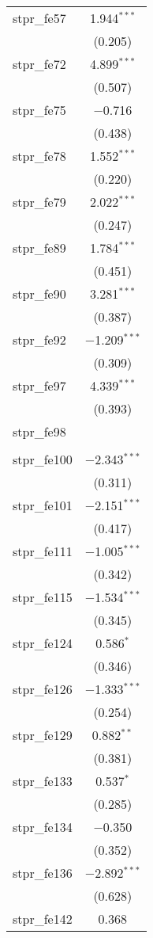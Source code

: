 \begin{table}[!htbp]
\begin{tabular}{@{\extracolsep{5pt}}lc}
  stpr\_fe57 & 1.944$^{***}$ \\ 
  & (0.205) \\ 
  stpr\_fe72 & 4.899$^{***}$ \\ 
  & (0.507) \\ 
  stpr\_fe75 & $-$0.716 \\ 
  & (0.438) \\ 
  stpr\_fe78 & 1.552$^{***}$ \\ 
  & (0.220) \\ 
  stpr\_fe79 & 2.022$^{***}$ \\ 
  & (0.247) \\ 
  stpr\_fe89 & 1.784$^{***}$ \\ 
  & (0.451) \\ 
  stpr\_fe90 & 3.281$^{***}$ \\ 
  & (0.387) \\ 
  stpr\_fe92 & $-$1.209$^{***}$ \\ 
  & (0.309) \\ 
  stpr\_fe97 & 4.339$^{***}$ \\ 
  & (0.393) \\ 
  stpr\_fe98 &  \\ 
  &  \\ 
  stpr\_fe100 & $-$2.343$^{***}$ \\ 
  & (0.311) \\ 
  stpr\_fe101 & $-$2.151$^{***}$ \\ 
  & (0.417) \\ 
  stpr\_fe111 & $-$1.005$^{***}$ \\ 
  & (0.342) \\ 
  stpr\_fe115 & $-$1.534$^{***}$ \\ 
  & (0.345) \\ 
  stpr\_fe124 & 0.586$^{*}$ \\ 
  & (0.346) \\ 
  stpr\_fe126 & $-$1.333$^{***}$ \\ 
  & (0.254) \\ 
  stpr\_fe129 & 0.882$^{**}$ \\ 
  & (0.381) \\ 
  stpr\_fe133 & 0.537$^{*}$ \\ 
  & (0.285) \\ 
  stpr\_fe134 & $-$0.350 \\ 
  & (0.352) \\ 
  stpr\_fe136 & $-$2.892$^{***}$ \\ 
  & (0.628) \\ 
  stpr\_fe142 & 0.368 \\ 

\end{tabular}
\end{table}

